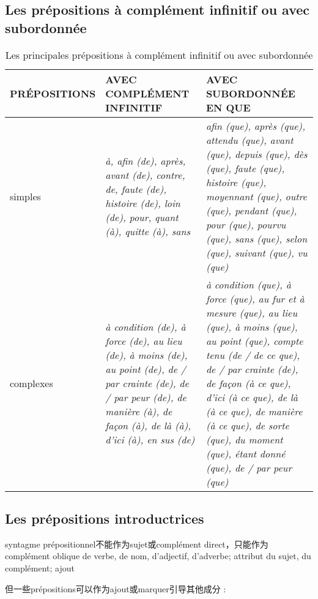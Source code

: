 \documentclass[UTF8]{report}
\begin{document}
\subsection{Les prépositions à complément infinitif ou avec subordonnée}
\begin{table}[htbp]
    \centering
    \small
    \setlength{\extrarowheight}{2pt} %
    \begin{tabular}{|>{\raggedright\arraybackslash}p{}|>{\raggedright\arraybackslash}p{}|>{\raggedright\arraybackslash}p{}|}
        \hline
        \rowcolor{cyan!20}
        \textbf{PRÉPOSITIONS} & \textbf{AVEC COMPLÉMENT INFINITIF} & \textbf{AVEC SUBORDONNÉE EN QUE} \\
        \hline
        simples & \textit{à, afin (de), après, avant (de), contre, de, faute (de), histoire (de), loin (de), pour, quant (à), quitte (à), sans} & \textit{afin (que), après (que), attendu (que), avant (que), depuis (que), dès (que), faute (que), histoire (que), moyennant (que), outre (que), pendant (que), pour (que), pourvu (que), sans (que), selon (que), suivant (que), vu (que)} \\
        \hline
        complexes & \textit{à condition (de), à force (de), au lieu (de), à moins (de), au point (de), de / par crainte (de), de / par peur (de), de manière (à), de façon (à), de là (à), d'ici (à), en sus (de)} & \textit{à condition (que), à force (que), au fur et à mesure (que), au lieu (que), à moins (que), au point (que), compte tenu (de / de ce que), de / par crainte (de), de façon (à ce que), d'ici (à ce que), de là (à ce que), de manière (à ce que), de sorte (que), du moment (que), étant donné (que), de / par peur (que)} \\
        \hline
    \end{tabular}
    \captionsetup{font=small} 
    \caption{Les principales prépositions à complément infinitif ou avec subordonnée}
\end{table}

\subsection{Les prépositions introductrices}
syntagme prépositionnel不能作为sujet或complément direct，只能作为complément oblique de verbe, de nom, d’adjectif, d’adverbe; attribut du sujet, du complément; ajout

但一些prépositions可以作为ajout或marquer引导其他成分 :
\end{document}

